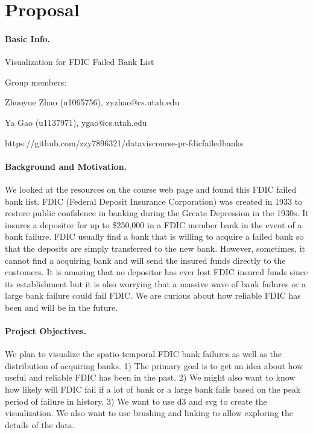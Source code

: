 \section{Proposal}
\paragraph{Basic Info.} Visualization for FDIC Failed Bank List

Group members:

Zhuoyue Zhao (u1065756), zyzhao@cs.utah.edu

Ya Gao (u1137971), ygao@cs.utah.edu

https://github.com/zzy7896321/dataviscourse-pr-fdicfailedbanks


\paragraph{Background and Motivation.}

We looked at the resources on the course web page and found this FDIC failed
bank list. FDIC (Federal Deposit Insurance Corporation) was created in 1933
to restore public confidence in banking during the Greate Depression in the
1930s.  It insures a depositor for up to \$250,000 in a FDIC member bank in
the event of a bank failure. FDIC usually find a bank that is willing to
acquire a failed bank so that the deposits are simply transferred to the new
bank. However, sometimes, it cannot find a acquiring bank and will send the
insured funds directly to the customers. It is amazing that no depositor has
ever lost FDIC insured funds since its establishment but it is also worrying
that a massive wave of bank failures or a large bank failure could fail FDIC.
We are curious about how reliable FDIC has been and will be in the future.

\paragraph{Project Objectives.} 
We plan to visualize the spatio-temporal FDIC bank failures as well as the
distribution of acquiring banks. 1) The primary goal is to get an idea about
how useful and reliable FDIC has been in the past. 2) We might also want to
know how likely will FDIC fail if a lot of bank or a large bank fails based on
the peak period of failure in history. 3) We want to use d3 and svg to create
the visualization. We also want to use brushing and linking to allow exploring
the details of the data.

